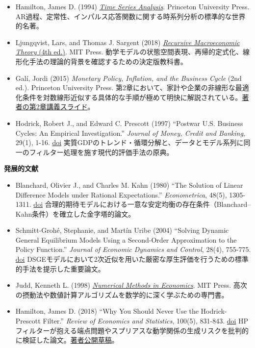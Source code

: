 \documentclass[
  japanese,
  lualatex,
  ja=standard,
  12pt,
  a4paper]{ltjsarticle}
\providecommand{\tightlist}{%
  \setlength{\itemsep}{0pt}\setlength{\parskip}{0pt}}
\begin{document}
\begin{itemize}
\tightlist
\item
  Hamilton, James D. (1994)
  \href{https://www.jstor.org/stable/j.ctv14jx6sm}{\emph{Time Series
  Analysis}}. Princeton University Press.
  AR過程、定常性、インパルス応答関数に関する時系列分析の標準的な世界的名著。
\item
  Ljungqvist, Lars, and Thomas J. Sargent (2018)
  \href{https://mitpress.mit.edu/9780262038669/recursive-macroeconomic-theory/}{\emph{Recursive
  Macroeconomic Theory} (4th ed.)}. MIT Press.
  動学モデルの状態空間表現、再帰的定式化、線形化手法の理論的背景を確認するための決定版教科書。
\item
  Galí, Jordi (2015) \emph{Monetary Policy, Inflation, and the Business
  Cycle} (2nd ed.). Princeton University Press.
  第2章において、家計や企業の非線形な最適化条件を対数線形近似する具体的な手順が極めて明快に解説されている。\href{https://crei.cat/wp-content/uploads/users/pages/ch2_slides_october_2015.pdf}{著者の第2章講義スライド}。
\item
  Hodrick, Robert J., and Edward C. Prescott (1997) ``Postwar U.S.
  Business Cycles: An Empirical Investigation.'' \emph{Journal of Money,
  Credit and Banking}, 29(1), 1-16.
  \href{https://doi.org/10.2307/2953682}{doi}
  実質GDPのトレンド・循環分解と、データとモデル系列に同一のフィルター処理を施す現代的評価手法の原典。
\end{itemize}

\newpage

\textbf{発展的文献}

\begin{itemize}
\tightlist
\item
  Blanchard, Olivier J., and Charles M. Kahn (1980) ``The Solution of
  Linear Difference Models under Rational Expectations.''
  \emph{Econometrica}, 48(5), 1305-1311.
  \href{https://doi.org/10.2307/1912186}{doi}
  合理的期待モデルにおける一意な安定均衡の存在条件（Blanchard--Kahn条件）を確立した金字塔的論文。
\item
  Schmitt-Grohé, Stephanie, and Martín Uribe (2004) ``Solving Dynamic
  General Equilibrium Models Using a Second-Order Approximation to the
  Policy Function.'' \emph{Journal of Economic Dynamics and Control},
  28(4), 755-775.
  \href{https://doi.org/10.1016/S0165-1889(03)00043-5}{doi}
  DSGEモデルにおいて2次近似を用いた厳密な厚生評価を行うための標準的手法を提示した重要論文。
\item
  Judd, Kenneth L. (1998)
  \href{https://mitpress.mit.edu/9780262547741/numerical-methods-in-economics/}{\emph{Numerical
  Methods in Economics}}. MIT Press.
  高次の摂動法や数値計算アルゴリズムを数学的に深く学ぶための専門書。
\item
  Hamilton, James D. (2018) ``Why You Should Never Use the
  Hodrick-Prescott Filter.'' \emph{Review of Economics and Statistics},
  100(5), 831-843. \href{https://doi.org/10.1162/rest_a_00706}{doi}
  HPフィルターが抱える端点問題やスプリアスな動学関係の生成リスクを批判的に検証した論文。\href{https://econweb.ucsd.edu/~jhamilto/hp.pdf}{著者公開草稿}。
\end{itemize}
\end{document}
